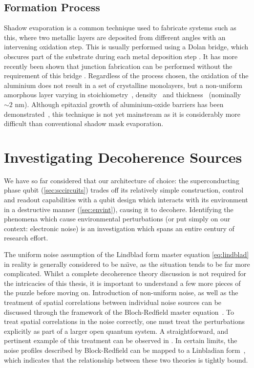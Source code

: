 \subsection{Formation Process}\label{sec:formation}

Shadow evaporation is a common technique used to fabricate systems such as this, where two metallic layers are deposited from different angles with an intervening oxidation step.
This is usually performed using a Dolan bridge, which obscures part of the substrate during each metal deposition step \cite{Dolan1977}.
It has more recently been shown that junction fabrication can be performed without the requirement of this bridge \cite{Lecocq2011}.
Regardless of the process chosen, the oxidation of the aluminium does not result in a set of crystalline monolayers, but a non-uniform amorphous layer varying in stoichiometry~\cite{Park2002, Tan2005}, density~\cite{Barbour1998} and thickness~\cite{Gloos2003,Aref2014,Zeng2014} (nominally $\sim\!2$ nm).  Although epitaxial growth of aluminium-oxide barriers has been demonstrated~\cite{Oh2006}, this technique is not yet mainstream as it is considerably more difficult than conventional shadow mask evaporation.


\section{Investigating Decoherence Sources}\label{sec:invnoise}

We have so far considered that our architecture of choice: the superconducting phase qubit (\cref{sec:sccircuits}) trades off its relatively simple construction, control and readout capabilities with a qubit design which interacts with its environment in a destructive manner (\cref{sec:envint}), causing it to decohere.
Identifying the phenomena which cause environmental perturbations (or put simply on our context: electronic noise) is an investigation which spans an entire century of research effort.

The uniform noise assumption of the Lindblad form master equation \cref{eq:lindblad} in reality is generally considered to be na\"{\i}ve, as the situation tends to be far more complicated.
Whilst a complete decoherence theory discussion is not required for the intricacies of this thesis, it is important to understand a few more pieces of the puzzle before moving on.
Introduction of non-uniform noise, as well as the treatment of spatial correlations between individual noise sources can be discussed through the framework of the Bloch-Redfield master equation~\cite{Carmichael1999}.
To treat spatial correlations in the noise correctly, one must treat the perturbations explicitly as part of a larger open quantum system. A straightforward, and pertinent example of this treatment can be observed in .
In certain limits, the noise profiles described by Block-Redfield can be mapped to a Linbladian form~\cite{Jeske2013, Jeske2015}, which indicates that the relationship between these two theories is tightly bound.

